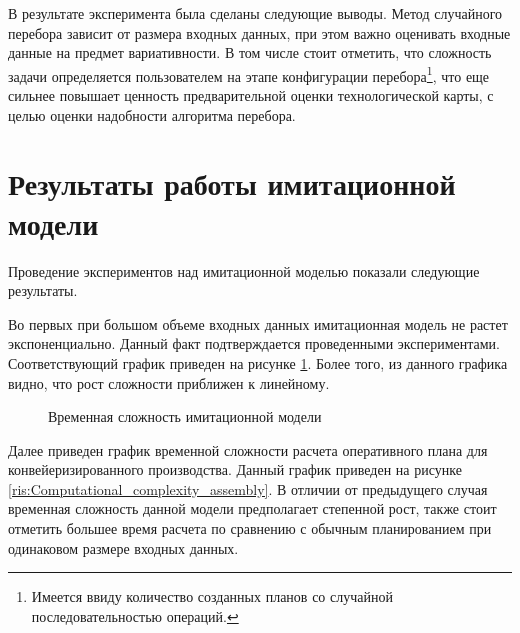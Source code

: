В результате эксперимента была сделаны следующие выводы. Метод случайного перебора зависит от размера входных данных, при этом важно оценивать входные данные на предмет вариативности. В том числе стоит отметить, что сложность задачи определяется пользователем на этапе конфигурации перебора\footnote{Имеется ввиду количество созданных планов со случайной последовательностью операций.}, что еще сильнее повышает ценность предварительной оценки технологической карты, с целью оценки надобности алгоритма перебора.

\section{Результаты работы имитационной модели}

Проведение экспериментов над имитационной моделью показали следующие результаты.

Во первых при большом объеме входных данных имитационная модель не растет экспоненциально. Данный факт подтверждается проведенными экспериментами. Соответствующий график приведен на рисунке \ref{ris:Computational_complexity_imcore}.
Более того, из данного графика видно, что рост сложности приближен к линейному.

\begin{figure}[H]
    \caption{Временная сложность имитационной модели}
    \label{ris:Computational_complexity_imcore}
\end{figure}

Далее приведен график временной сложности расчета оперативного плана для конвейеризированного производства. Данный график приведен на рисунке \ref{ris:Computational_complexity_assembly}. В отличии от предыдущего случая временная сложность данной модели предполагает степенной рост, также стоит отметить большее время расчета по сравнению с обычным планированием при одинаковом размере входных данных.


